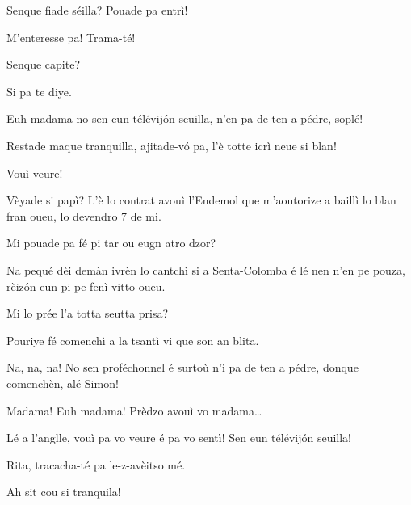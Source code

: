 \begin{drama}

\Pascalspeaks Senque fiade séilla? Pouade pa entrì!

\Eumprezeospeaks M’enteresse pa! Trama-té!

\Ritaspeaks Senque capite? 


\Pascalspeaks Si pa te diye.

\Ritaspeaks {} Euh madama no sen eun télévijón seuilla, n'en pa de ten a pédre, soplé!

\Eumprezeospeaks Restade maque tranquilla, ajitade-v\'o pa, l’è tot\-te icrì neue si blan!


\Ritaspeaks Vouì veure!

\Eumprezeospeaks  Vèyade si papì? L’è lo contrat avouì l’Endemol que m’aoutorize a baillì lo blan fran oueu, lo devendro 7 de mi.

\Ritaspeaks Mi pouade pa fé pi tar ou eugn atro dzor?

\Eumprezeospeaks Na pequé dèi demàn ivrèn lo cantchì si a Senta-Co\-lom\-ba é lé nen n’en pe pouza, rèizón eun pi pe fenì vitto oueu.

\Ritaspeaks Mi lo prée l'a totta seutta prisa? 

\Pascalspeaks Pouriye fé comenchì a la tsantì vi que son an blita.

\Eumprezeospeaks Na, na, na! No sen proféchonnel é surtoù n’i pa de ten a pédre, donque comenchèn, alé Simon!


\Ritaspeaks Madama! Euh madama! Prèdzo avouì vo madama\ldots


\Ritaspeaks Lé a l'anglle, vouì pa vo veure é pa vo sentì! Sen eun télévij\'on seuilla!

\Pascalspeaks Rita, tracacha-té pa le-z-avèitso mé.

\Ritaspeaks {} Ah sit cou si tranquila!


\end{drama}
